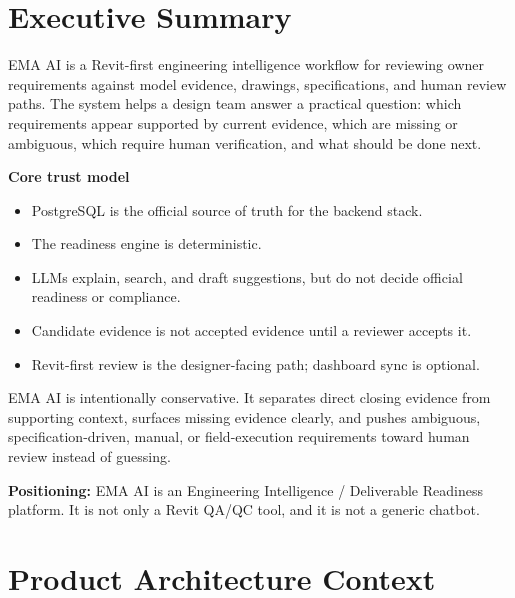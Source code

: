 \documentclass[10pt,letterpaper]{article}
\newcommand{\strong}[1]{\textbf{\textcolor{emaNavy}{#1}}}
\newcommand{\keyconcept}[1]{%
\begin{tcolorbox}[colback=emaSoft,borderline west={3pt}{0pt}{emaBlue}]
\small #1
\end{tcolorbox}}
\begin{document}
\newpage
\tableofcontents
\newpage

\section{Executive Summary}

EMA AI is a Revit-first engineering intelligence workflow for reviewing owner requirements against model evidence, drawings, specifications, and human review paths. The system helps a design team answer a practical question: which requirements appear supported by current evidence, which are missing or ambiguous, which require human verification, and what should be done next.

\begin{tcolorbox}[colback=emaSoft]
\strong{Core trust model}
\begin{itemize}
  \item PostgreSQL is the official source of truth for the backend stack.
  \item The readiness engine is deterministic.
  \item LLMs explain, search, and draft suggestions, but do not decide official readiness or compliance.
  \item Candidate evidence is not accepted evidence until a reviewer accepts it.
  \item Revit-first review is the designer-facing path; dashboard sync is optional.
\end{itemize}
\end{tcolorbox}

EMA AI is intentionally conservative. It separates direct closing evidence from supporting context, surfaces missing evidence clearly, and pushes ambiguous, specification-driven, manual, or field-execution requirements toward human review instead of guessing.

\keyconcept{\strong{Positioning:} EMA AI is an Engineering Intelligence / Deliverable Readiness platform. It is not only a Revit QA/QC tool, and it is not a generic chatbot.}

\section{Product Architecture Context}
\end{document}
